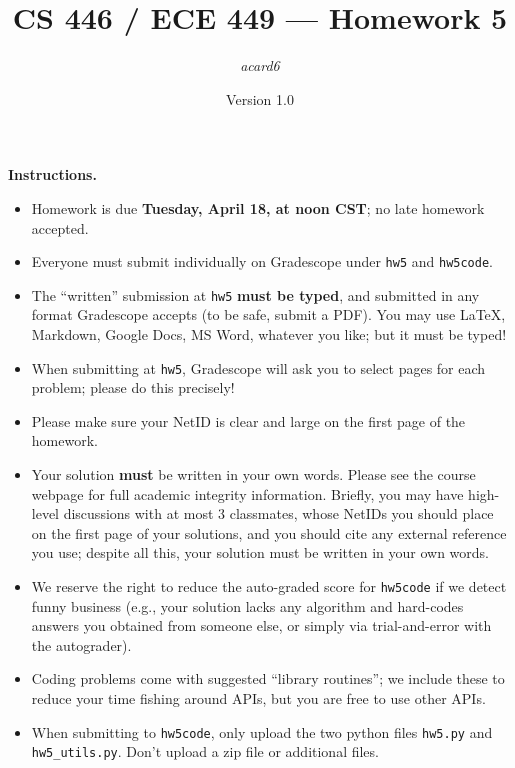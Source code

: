 \documentclass{article}
\title{CS 446 / ECE 449 --- Homework 5}
\author{\emph{acard6}}
\date{Version 1.0}
\theoremstyle{definition}
\theoremstyle{remark}
\begin{document}
\maketitle

\noindent\textbf{Instructions.}
\begin{itemize}
  \item
    Homework is due \textbf{Tuesday, April 18, at noon CST}; no late homework accepted.

  \item
    Everyone must submit individually on Gradescope under \texttt{hw5} and \texttt{hw5code}.

  \item
    The ``written'' submission at \texttt{hw5} \textbf{must be typed}, and submitted in
    any format Gradescope accepts (to be safe, submit a PDF).  You may use \LaTeX, Markdown,
    Google Docs, MS Word, whatever you like; but it must be typed!

  \item
    When submitting at \texttt{hw5}, Gradescope will ask you to select pages
    for each problem; please do this precisely!

  \item
    Please make sure your NetID is clear and large on the first page of the homework.

  \item
    Your solution \textbf{must} be written in your own words.
    Please see the course webpage for full academic integrity information.
    Briefly, you may have high-level discussions with at most 3 classmates,
    whose NetIDs you should place on the first page of your solutions,
    and you should cite any external reference you use; despite all this,
    your solution must be written in your own words.

    \item
      We reserve the right to reduce the auto-graded score for
      \texttt{hw5code} if we detect funny business (e.g., your solution
      lacks any algorithm and hard-codes answers you obtained from
      someone else, or simply via trial-and-error with the autograder).

    \item
      Coding problems come with suggested ``library routines''; we include these to reduce
      your time fishing around APIs, but you are free to use other APIs.

    \item
      When submitting to \texttt{hw5code}, only upload the two python files \texttt{hw5.py} and \texttt{hw5\_utils.py}. Don't upload a zip file or additional files.
    
\end{itemize}
\end{document}

